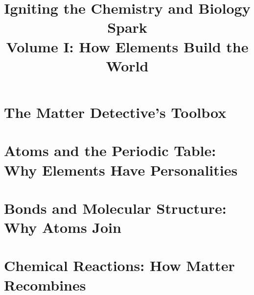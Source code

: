 \documentclass[12pt,openany,fontset=none,UTF8,scheme=chinese]{ctexbook}
\title{Igniting the Chemistry and Biology Spark\\Volume I: How Elements Build the World}
\author{}
\date{}
\begin{document}
\frontmatter
\maketitle

\tableofcontents

\mainmatter
\part{The Matter Detective's Toolbox}






\part{Atoms and the Periodic Table: Why Elements Have Personalities}












\part{Bonds and Molecular Structure: Why Atoms Join}










\part{Chemical Reactions: How Matter Recombines}











\backmatter
\end{document}

